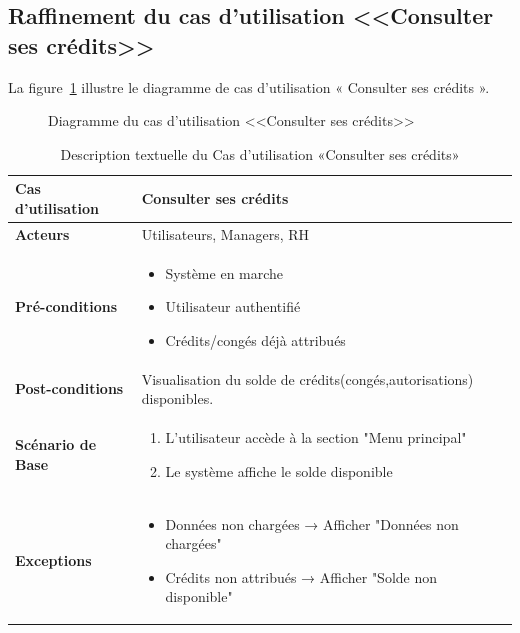     \subsection{Raffinement du cas d'utilisation <<Consulter ses crédits>>}
La figure~\ref{fig:cscredits} illustre le diagramme de cas d'utilisation « Consulter ses crédits ».
\newpage
\begin{figure}[h]
     \centering
     \caption{Diagramme du cas d'utilisation <<Consulter ses crédits>>}
     \label{fig:cscredits}
\end{figure}
\begin{table}[!ht]
    \begin{adjustwidth}{-2cm}{-2cm}
    \centering
    \caption{Description textuelle du Cas d'utilisation «Consulter ses crédits»}
    \label{tab:consult_credits}
    \renewcommand{\arraystretch}{1.2}
    \begin{tabular}{|p{4.2cm}|p{11cm}|}
    \hline
    \textbf{Cas d'utilisation} & Consulter ses crédits \\
    \hline
    \textbf{Acteurs} & Utilisateurs, Managers, RH \\
    \hline
    \textbf{Pré-conditions} & 
    \begin{itemize}
    \item Système en marche
    \item Utilisateur authentifié
    \item Crédits/congés déjà attribués
    \end{itemize} \\
    \hline
    \textbf{Post-conditions} & Visualisation du solde de crédits(congés,autorisations) disponibles. \\
    \hline
    \textbf{Scénario de Base} & 
    \begin{enumerate}
    \item L'utilisateur accède à la section "Menu principal"
    \item Le système affiche le solde disponible
    \end{enumerate} \\
    \hline
    \textbf{Exceptions} & 
    \begin{itemize}
    \item Données non chargées → Afficher "Données non chargées"
    \item Crédits non attribués → Afficher "Solde non disponible"
    \end{itemize} \\
    \hline
    \end{tabular}
    \end{adjustwidth}
\end{table}

